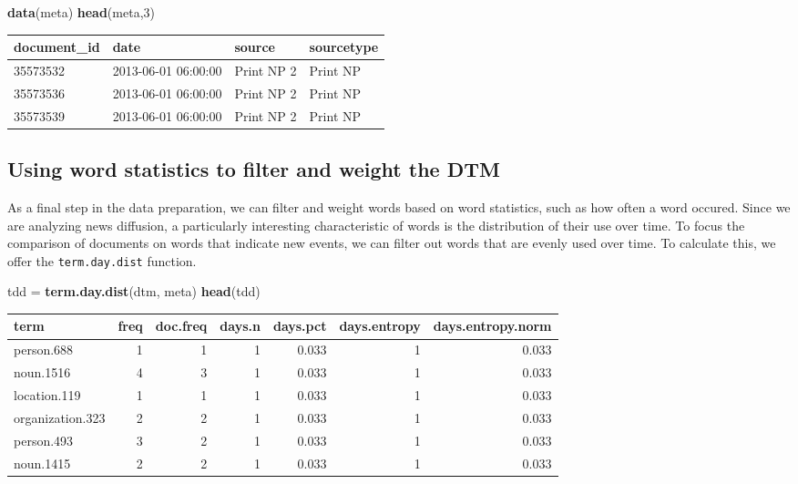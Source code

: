 \documentclass[]{article}
\newenvironment{Shaded}{\begin{snugshade}}{\end{snugshade}}
\newcommand{\KeywordTok}[1]{\textcolor[rgb]{0.13,0.29,0.53}{\textbf{{#1}}}}
\newcommand{\DecValTok}[1]{\textcolor[rgb]{0.00,0.00,0.81}{{#1}}}
\newcommand{\StringTok}[1]{\textcolor[rgb]{0.31,0.60,0.02}{{#1}}}
\newcommand{\NormalTok}[1]{{#1}}
\begin{document}
\begin{Shaded}
\begin{Highlighting}[]
\KeywordTok{data}\NormalTok{(meta)}
\KeywordTok{head}\NormalTok{(meta,}\DecValTok{3}\NormalTok{)}
\end{Highlighting}
\end{Shaded}

\begin{longtable}[c]{@{}llll@{}}
\toprule
document\_id & date & source & sourcetype\tabularnewline
\midrule
\endhead
35573532 & 2013-06-01 06:00:00 & Print NP 2 & Print NP\tabularnewline
35573536 & 2013-06-01 06:00:00 & Print NP 2 & Print NP\tabularnewline
35573539 & 2013-06-01 06:00:00 & Print NP 2 & Print NP\tabularnewline
\bottomrule
\end{longtable}

\subsection{Using word statistics to filter and weight the
DTM}\label{using-word-statistics-to-filter-and-weight-the-dtm}

As a final step in the data preparation, we can filter and weight words
based on word statistics, such as how often a word occured. Since we are
analyzing news diffusion, a particularly interesting characteristic of
words is the distribution of their use over time. To focus the
comparison of documents on words that indicate new events, we can filter
out words that are evenly used over time. To calculate this, we offer
the \texttt{term.day.dist} function.

\begin{Shaded}
\begin{Highlighting}[]
\NormalTok{tdd =}\StringTok{ }\KeywordTok{term.day.dist}\NormalTok{(dtm, meta)}
\KeywordTok{head}\NormalTok{(tdd)}
\end{Highlighting}
\end{Shaded}

\begin{longtable}[c]{@{}lrrrrrr@{}}
\toprule
term & freq & doc.freq & days.n & days.pct & days.entropy &
days.entropy.norm\tabularnewline
\midrule
\endhead
person.688 & 1 & 1 & 1 & 0.033 & 1 & 0.033\tabularnewline
noun.1516 & 4 & 3 & 1 & 0.033 & 1 & 0.033\tabularnewline
location.119 & 1 & 1 & 1 & 0.033 & 1 & 0.033\tabularnewline
organization.323 & 2 & 2 & 1 & 0.033 & 1 & 0.033\tabularnewline
person.493 & 3 & 2 & 1 & 0.033 & 1 & 0.033\tabularnewline
noun.1415 & 2 & 2 & 1 & 0.033 & 1 & 0.033\tabularnewline
\bottomrule
\end{longtable}
\end{document}
